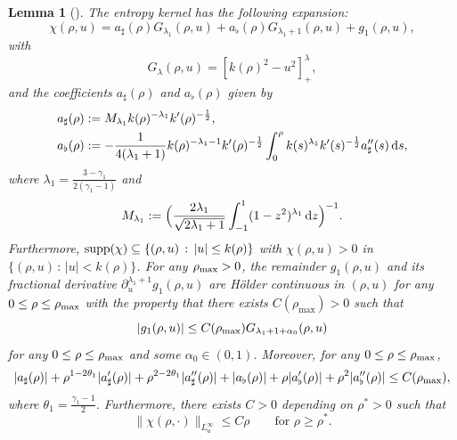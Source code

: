 \documentclass[reqno,11pt]{amsart}
\numberwithin{equation}{section}
\newtheorem{lemma}[theorem]{Lemma}
\theoremstyle{definition}
\def\dd{{\, \rm d}}
\def\supp{{\rm supp}}
\begin{document}
\begin{lemma}[]
The entropy kernel has the following expansion:
\[
\chi(\rho,u) = a_\sharp(\rho) G_{\lambda_1}(\rho,u) + a_\flat(\rho) G_{\lambda_1 + 1}(\rho,u) + g_1(\rho,u),
\]
with
\[
G_{\lambda}(\rho,u) = [k(\rho)^2 - u^2]^\lambda_+,
\]
and the coefficients $a_\sharp(\rho)$ and $a_\flat(\rho)$ given by
\begin{align*}
\displaystyle &a_\sharp(\rho) := M_{\lambda_1} k(\rho)^{-\lambda_1} k'(\rho)^{-\frac{1}{2}}, \\            \displaystyle &a_\flat(\rho) := -\frac{1}{4(\lambda_1 + 1)}k(\rho)^{-\lambda_1 - 1} 
k'(\rho)^{-\frac{1}{2}} \int^\rho_0 k(s)^{\lambda_1} k'(s)^{-\frac{1}{2}} a_\sharp''(s) \dd s,
\end{align*}
where  $\lambda_1=\frac{3-\gamma_1}{2(\gamma_1-1)}$ and
\[
M_{\lambda_1} := \Big ( \frac{2\lambda_1}{\sqrt{2\lambda_1 + 1}} 
\int^1_{-1} (1-z^2)^{\lambda_1} \dd z \Big )^{-1}.
\]
Furthermore, $\supp (\chi) \subseteq \{ (\rho,u) \, : \, |u| \leq k(\rho) \}$ 
with $\chi(\rho,u) > 0$ in $\{ (\rho,u) \, : \, |u| < k(\rho) \}$. 
For any $\rho_\text{\rm max} > 0$, 
the remainder $g_1(\rho,u)$ and its fractional derivative $\partial^{\lambda_1 + 1}_u g_1(\rho,u)$ 
are H\"older continuous in $(\rho,u)$ for any $0 \leq \rho \leq \rho_\text{\rm max}$ 
with the property that there exists $C(\rho_\text{max}) > 0$ such that
\[
|g_1(\rho,u)| \leq C(\rho_\text{\rm max} )G_{\lambda_1 + 1 + \alpha_0}(\rho,u)
\]
for any $0 \leq \rho \leq \rho_\text{\rm max}$ and some $\alpha_0 \in (0,1)$. 
Moreover, for any $0 \leq \rho \leq \rho_\text{\rm max}$,
 \[
|a_\sharp(\rho)| + \rho^{1-2\theta_1} |a_\sharp'(\rho)| + \rho^{2-2\theta_1} |a_\sharp''(\rho)| 
+ |a_\flat(\rho)| + \rho |a_\flat'(\rho)| + \rho^2 |a_\flat''(\rho)| \leq C(\rho_\text{\rm max}),
\]
where $\theta_1=\frac{\gamma_1-1}{2}$.
Furthermore, there exists $C > 0$ depending on $\rho^* > 0$ such that
 \[
 \|\chi(\rho,\cdot)\|_{L^\infty_u} \leq C\rho
 \qquad\mbox{for $\rho \geq \rho^*$}.
 \]
\end{lemma}
\end{document}
